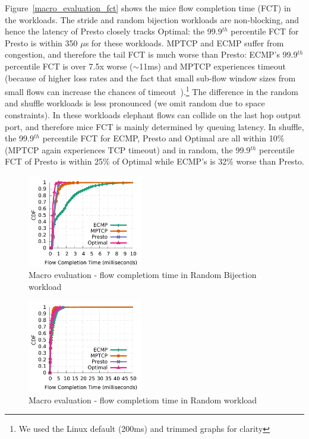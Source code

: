 Figure~\ref{macro_evaluation_fct} shows the mice flow completion time (FCT) in
the workloads. 
The stride and random bijection workloads are non-blocking, and hence the latency of Presto
closely tracks Optimal: the 99.9$^{th}$ percentile FCT for Presto is within 350 $\mu$s for these workloads.
MPTCP and ECMP suffer from congestion, and therefore the tail FCT is much worse than Presto: ECMP's 99.9$^{th}$ percentile
FCT is over 7.5x worse ($\sim$11ms) and MPTCP experiences timeout (because of higher loss
rates and the fact that small sub-flow window sizes from small flows can increase the chances of timeout~\cite{dc-mptcp}).\footnote{We used the Linux default (200ms) and trimmed graphs for clarity}
The difference in the random and shuffle workloads is less pronounced (we omit random due to space constraints).
In these workloads elephant flows can collide on the last hop output port,
and therefore mice FCT is mainly determined by queuing latency. In shuffle, the 99.9$^{th}$ percentile FCT for ECMP, Presto and Optimal
are all within 10\% (MPTCP again experiences TCP timeout) and in random, the 99.9$^{th}$ percentile FCT of Presto is within 25\% of Optimal while ECMP's 
is 32\% worse than Presto.


\iffalse
\begin{figure}[!t]
        \centering
  \includegraphics[width=0.45\textwidth]{./figures/macro/bijection/macro_compare_fct_bijection_mice.pdf}
        \caption{Macro evaluation - flow completiom time in Random Bijection workload}
        \label{macro_evaluation_fct_bijection}
\end{figure}

\begin{figure}[!t]
        \centering
  \includegraphics[width=0.45\textwidth]{./figures/macro/random/macro_compare_fct_random_mice.pdf}
        \caption{Macro evaluation - flow completiom time in Random workload}
        \label{macro_evaluation_fct_random}
\end{figure}


